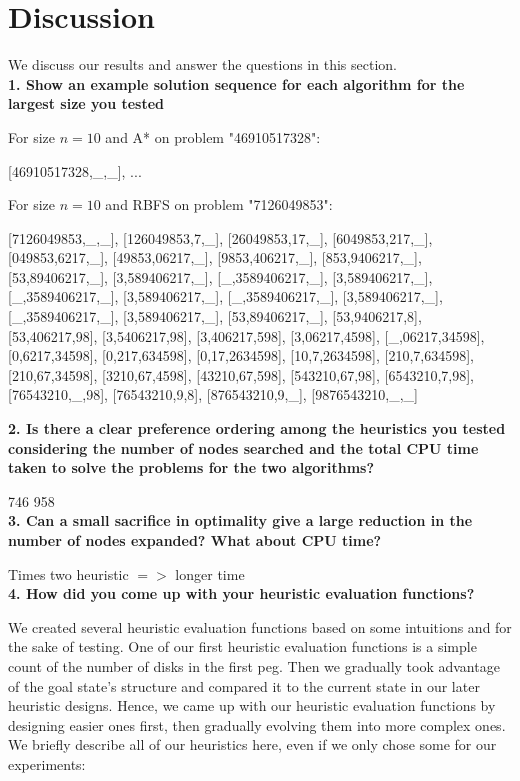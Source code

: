 \section{Discussion}

We discuss our results and answer the questions in this section.\\

\textbf{1. Show an example solution sequence for each algorithm for the largest size you tested}

For size $n = 10$ and A* on problem "46910517328":

[46910517328,\_,\_], ...

For size $n = 10$ and RBFS on problem "7126049853":

[7126049853,\_,\_], [126049853,7,\_], [26049853,17,\_], [6049853,217,\_], [049853,6217,\_], [49853,06217,\_], [9853,406217,\_], [853,9406217,\_], [53,89406217,\_], [3,589406217,\_], [\_,3589406217,\_], [3,589406217,\_], [\_,3589406217,\_], [3,589406217,\_], [\_,3589406217,\_], [3,589406217,\_], [\_,3589406217,\_], [3,589406217,\_], [53,89406217,\_], [53,9406217,8], [53,406217,98], [3,5406217,98], [3,406217,598], [3,06217,4598], [\_,06217,34598], [0,6217,34598], [0,217,634598], [0,17,2634598], [10,7,2634598], [210,7,634598], [210,67,34598], [3210,67,4598], [43210,67,598], [543210,67,98], [6543210,7,98], [76543210,\_,98], [76543210,9,8], [876543210,9,\_], [9876543210,\_,\_]

\textbf{2. Is there a clear preference ordering among the heuristics you tested considering the number of nodes searched and the total CPU time taken to solve the problems for the two algorithms?}

746 958\\

\textbf{3. Can a small sacrifice in optimality give a large reduction in the number of nodes expanded? What about CPU time?}

Times two heuristic $=>$ longer time\\

\textbf{4. How did you come up with your heuristic evaluation functions?}

We created several heuristic evaluation functions based on some intuitions and for the sake of testing. One of our first heuristic evaluation functions is a simple count of the number of disks in the first peg. Then we gradually took advantage of the goal state's structure and compared it to the current state in our later heuristic designs. Hence, we came up with our heuristic evaluation functions by designing easier ones first, then gradually evolving them into more complex ones. We briefly describe all of our heuristics here, even if we only chose some for our experiments:

